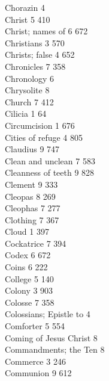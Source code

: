 Chorazin \hfill 4 \\
Christ \hfill 5 \quad \phantom{0}410\\
Christ; names of \hfill 6 \quad \phantom{0}672\\
Christians \hfill 3 \quad \phantom{0}570\\
Christs; false \hfill 4 \quad \phantom{0}652\\
Chronicles \hfill 7 \quad \phantom{0}358\\
Chronology \hfill 6 \\
Chrysolite \hfill 8 \\
Church \hfill 7 \quad \phantom{0}412\\
Cilicia \hfill 1 \quad \phantom{0}\phantom{0}64\\
Circumcision \hfill 1 \quad \phantom{0}676\\
Cities of refuge \hfill 4 \quad \phantom{0}805\\
Claudius \hfill 9 \quad \phantom{0}747\\
Clean and unclean \hfill 7 \quad \phantom{0}583\\
Cleanness of teeth \hfill 9 \quad \phantom{0}828\\
Clement \hfill 9 \quad \phantom{0}333\\
Cleopas \hfill 8 \quad \phantom{0}269\\
Cleophas \hfill 7 \quad \phantom{0}277\\
Clothing \hfill 7 \quad \phantom{0}367\\
Cloud \hfill 1 \quad \phantom{0}397\\
Cockatrice \hfill 7 \quad \phantom{0}394\\
Codex \hfill 6 \quad \phantom{0}672\\
Coins \hfill 6 \quad \phantom{0}222\\
College \hfill 5 \quad \phantom{0}140\\
Colony \hfill 3 \quad \phantom{0}903\\
Colosse \hfill 7 \quad \phantom{0}358\\
Colossians; Epistle to \hfill 4 \\
Comforter \hfill 5 \quad \phantom{0}554\\
Coming of Jesus Christ \hfill 8 \\
Commandments; the Ten \hfill 8 \\
Commerce \hfill 3 \quad \phantom{0}246\\
Communion \hfill 9 \quad \phantom{0}612\\
